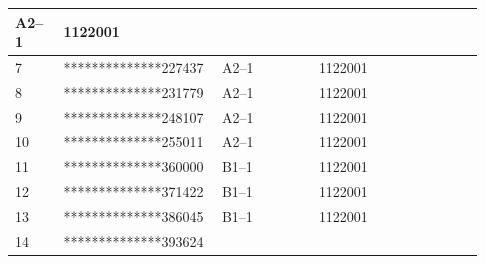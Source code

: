 \documentclass[UTF8,10pt,a4paper,fontset=fandol]{ctexart}
\newcommand{\fieldvalue}[1]{#1}
\begin{document}
\begin{tabular}{|p{0.10\linewidth}|p{0.29\linewidth}|p{0.20\linewidth}|p{0.22\linewidth}|p{0.12\linewidth}|}
\fieldvalue{A2--1}
&
\fieldvalue{1122001}
&\\
\hline
7 &
\fieldvalue{**************227437}
&
\fieldvalue{A2--1}
&
\fieldvalue{1122001}
&\\
\hline
8 &
\fieldvalue{**************231779}
&
\fieldvalue{A2--1}
&
\fieldvalue{1122001}
&\\
\hline
9 &
\fieldvalue{**************248107}
&
\fieldvalue{A2--1}
&
\fieldvalue{1122001}
&\\
\hline
10 &
\fieldvalue{**************255011}
&
\fieldvalue{A2--1}
&
\fieldvalue{1122001}
&\\
\hline
11 &
\fieldvalue{**************360000}
&
\fieldvalue{B1--1}
&
\fieldvalue{1122001}
&\\
\hline
12 &
\fieldvalue{**************371422}
&
\fieldvalue{B1--1}
&
\fieldvalue{1122001}
&\\
\hline
13 &
\fieldvalue{**************386045}
&
\fieldvalue{B1--1}
&
\fieldvalue{1122001}
&\\
\hline
14 &
\fieldvalue{**************393624}

\end{tabular}
\end{document}
